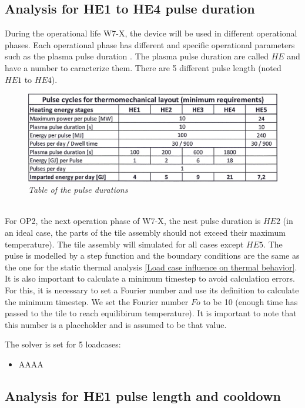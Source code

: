 \subsection{Analysis for HE1 to HE4 pulse duration}
\normalsize{During the operational life \acrshort{W7-X}, the device will be used in different operational phases. Each operational phase has different and specific operational parameters such as the plasma pulse duration \cite{Lorenz2020}. The plasma pulse duration are called $HE$ and have a number to caracterize them. There are 5 different pulse length (noted $HE1$ to $HE4$).}
\\
\begin{figure}[h!]
    \label{fig_5_12} 
    \centering
    \includegraphics[width=1\textwidth]{figures/pulselengthtable.png}
    \caption{\it Table of the pulse durations \cite{Lorenz2020}}
\end{figure}
\\
\normalsize{\indent For \acrshort{OP2}, the next operation phase of \acrshort{W7-X}, the nest pulse duration is {\bfseries $HE2$} (in an ideal case, the parts of the tile assembly should not exceed their maximum temperature). The tile assembly will simulated for all cases except $HE5$. The pulse is modelled by a step function and the boundary conditions are the same as the one for the static thermal analysis \ref{Load case influence on thermal behavior}.}
\\
\break
\normalsize{\indent It is also important to calculate a minimum timestep to avoid calculation errors. For this, it is necessary to set a Fourier number and use its definition to calculate the minimum timestep. We set the Fourier number $Fo$ to be 10 (enough time has passed to the tile to reach equilibirum temperature). It is important to note that this number is a placeholder and is assumed to be that value.}
\\
\break
\normalsize{\indent The solver is set for 5 loadcases:
\begin{itemize}
    \item AAAA
\end{itemize}
}
\subsection{Analysis for HE1 pulse length and cooldown}